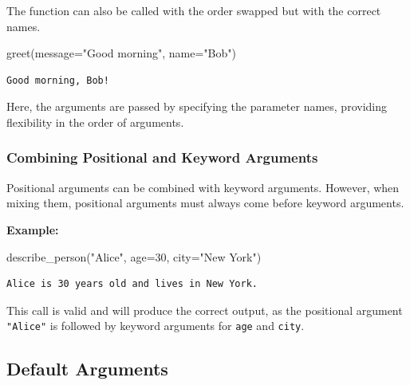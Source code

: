 \documentclass[
  letterpaper,
  DIV=11,
  numbers=noendperiod]{scrreprt}
\newenvironment{Shaded}{\begin{snugshade}}{\end{snugshade}}
\newcommand{\DecValTok}[1]{\textcolor[rgb]{0.68,0.00,0.00}{#1}}
\newcommand{\NormalTok}[1]{\textcolor[rgb]{0.00,0.23,0.31}{#1}}
\newcommand{\OperatorTok}[1]{\textcolor[rgb]{0.37,0.37,0.37}{#1}}
\newcommand{\StringTok}[1]{\textcolor[rgb]{0.13,0.47,0.30}{#1}}
\begin{document}
The function can also be called with the order swapped but with the
correct names.

\begin{Shaded}
\begin{Highlighting}[]
\NormalTok{greet(message}\OperatorTok{=}\StringTok{"Good morning"}\NormalTok{, name}\OperatorTok{=}\StringTok{"Bob"}\NormalTok{) }
\end{Highlighting}
\end{Shaded}

\begin{verbatim}
Good morning, Bob!
\end{verbatim}

Here, the arguments are passed by specifying the parameter names,
providing flexibility in the order of arguments.

\hypertarget{combining-positional-and-keyword-arguments}{%
\subsubsection{Combining Positional and Keyword
Arguments}\label{combining-positional-and-keyword-arguments}}

Positional arguments can be combined with keyword arguments. However,
when mixing them, positional arguments must always come before keyword
arguments.

\textbf{Example:}

\begin{Shaded}
\begin{Highlighting}[]
\NormalTok{describe\_person(}\StringTok{"Alice"}\NormalTok{, age}\OperatorTok{=}\DecValTok{30}\NormalTok{, city}\OperatorTok{=}\StringTok{"New York"}\NormalTok{)}
\end{Highlighting}
\end{Shaded}

\begin{verbatim}
Alice is 30 years old and lives in New York.
\end{verbatim}

This call is valid and will produce the correct output, as the
positional argument \texttt{"Alice"} is followed by keyword arguments
for \texttt{age} and \texttt{city}.

\hypertarget{default-arguments}{%
\subsection{Default Arguments}\label{default-arguments}}
\end{document}
